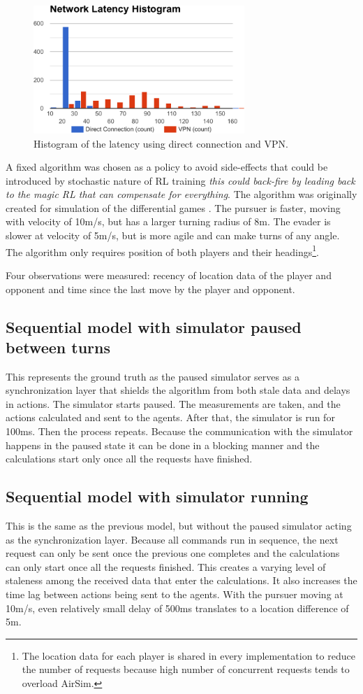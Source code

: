 \documentclass{article}
\begin{document}
\begin{figure}
	\centering
	\includegraphics[width=8.0cm]{network-latency}
	\caption{Histogram of the latency using direct connection and VPN.}\label{fig:network-latency}
\end{figure}

A fixed algorithm was chosen as a policy to avoid side-effects that could be introduced by stochastic nature of RL training \emph{this could back-fire by leading back to the magic RL that can compensate for everything}. The algorithm was originally created for simulation of the differential games \cite{anne-paper}. The pursuer is faster, moving with velocity of 10m/s, but has a larger turning radius of 8m. The evader is slower at velocity of 5m/s, but is more agile and can make turns of any angle. The algorithm only requires position of both players and their headings\footnote{The location data for each player is shared in every implementation to reduce the number of requests because high number of concurrent requests tends to overload AirSim.}. 

Four observations were measured: recency of location data of the player and opponent and time since the last move by the player and opponent.

\subsection{Sequential model with simulator paused between turns}
This represents the ground truth as the paused simulator serves as a synchronization layer that shields the algorithm from both stale data and delays in actions. The simulator starts paused. The measurements are taken, and the actions calculated and sent to the agents. After that, the simulator is run for 100ms. Then the process repeats. Because the communication with the simulator happens in the paused state it can be done in a blocking manner and the calculations start only once all the requests have finished.

\subsection{Sequential model with simulator running}
This is the same as the previous model, but without the paused simulator acting as the synchronization layer. Because all commands run in sequence, the next request can only be sent once the previous one completes and the calculations can only start once all the requests finished. This creates a varying level of staleness among the received data that enter the calculations. It also increases the time lag between actions being sent to the agents. With the pursuer moving at 10m/s, even relatively small delay of 500ms translates to a location difference of 5m.
\end{document}
